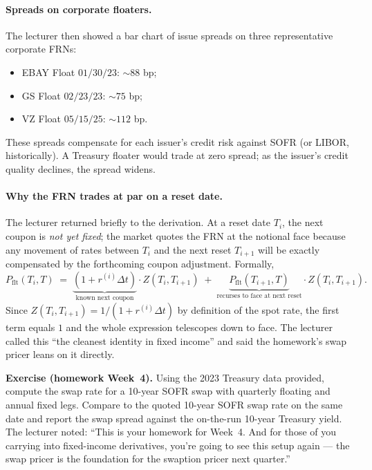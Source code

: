 \paragraph{Spreads on corporate floaters.} The lecturer then showed a bar
chart of issue spreads on three representative corporate FRNs:
\begin{itemize}
  \item EBAY Float $01/30/23$: ${\sim}88$ bp;
  \item GS Float $02/23/23$: ${\sim}75$ bp;
  \item VZ Float $05/15/25$: ${\sim}112$ bp.
\end{itemize}
These spreads compensate for each issuer's credit risk against SOFR (or
LIBOR, historically). A Treasury floater would trade at zero spread; as
the issuer's credit quality declines, the spread widens.

\paragraph{Why the FRN trades at par on a reset date.} The lecturer
returned briefly to the derivation. At a reset date $T_i$, the next
coupon is \emph{not yet fixed}; the market quotes the FRN at the notional
face because any movement of rates between $T_i$ and the next reset
$T_{i+1}$ will be exactly compensated by the forthcoming coupon
adjustment. Formally,
\[
  P_{\text{flt}}(T_i, T) \;=\; \underbrace{(1 + r^{(i)}\Delta t)}_{\text{known next coupon}}
     \cdot Z(T_i, T_{i+1}) \;+\;
     \underbrace{P_{\text{flt}}(T_{i+1}, T)}_{\text{recurses to face at next reset}} \cdot Z(T_i, T_{i+1}).
\]
Since $Z(T_i, T_{i+1}) = 1/(1+r^{(i)}\Delta t)$ by definition of the
spot rate, the first term equals $1$ and the whole expression telescopes
down to face. The lecturer called this ``the cleanest identity in fixed
income'' and said the homework's swap pricer leans on it directly.

\begin{exerciseblock}
\textbf{Exercise (homework Week~4).} Using the 2023 Treasury data provided,
compute the swap rate for a 10-year SOFR swap with quarterly floating and
annual fixed legs. Compare to the quoted 10-year SOFR swap rate on the
same date and report the swap spread against the on-the-run 10-year
Treasury yield. The lecturer noted: ``This is your homework for Week~4.
And for those of you carrying into fixed-income derivatives, you're
going to see this setup again --- the swap pricer is the foundation for
the swaption pricer next quarter.''
\end{exerciseblock}

